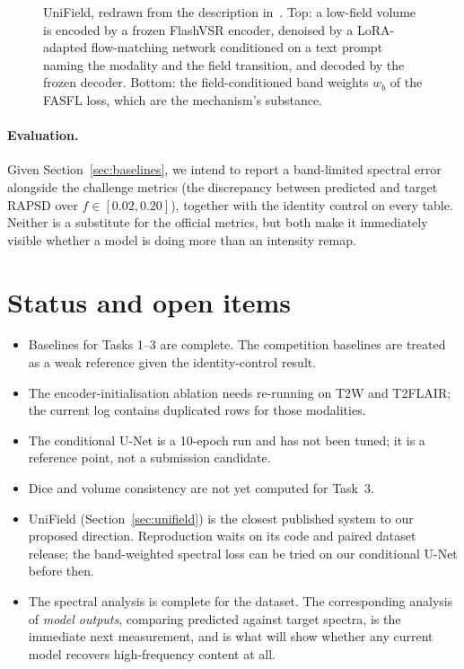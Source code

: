\documentclass[11pt,a4paper]{article}
\begin{document}
\begin{figure}[t]
  \caption{UniField, redrawn from the description in~\cite{lin2026unifield}. Top: a low-field volume is
  encoded by a frozen FlashVSR encoder, denoised by a LoRA-adapted flow-matching network conditioned on
  a text prompt naming the modality and the field transition, and decoded by the frozen decoder. Bottom:
  the field-conditioned band weights $w_b$ of the FASFL loss, which are the mechanism's substance.}
  \label{fig:unifield}
\end{figure}

\paragraph{Evaluation.} Given Section~\ref{sec:baselines}, we intend to report a band-limited spectral
error alongside the challenge metrics (the discrepancy between predicted and target RAPSD over
$f \in [0.02, 0.20]$), together with the identity control on every table. Neither is a substitute for
the official metrics, but both make it immediately visible whether a model is doing more than an
intensity remap.

\section{Status and open items}

\begin{itemize}
  \item Baselines for Tasks 1--3 are complete. The competition baselines are treated as a weak
  reference given the identity-control result.
  \item The encoder-initialisation ablation needs re-running on T2W and T2FLAIR; the current log
  contains duplicated rows for those modalities.
  \item The conditional U-Net is a 10-epoch run and has not been tuned; it is a reference point, not a
  submission candidate.
  \item Dice and volume consistency are not yet computed for Task~3.
  \item UniField (Section~\ref{sec:unifield}) is the closest published system to our proposed direction.
  Reproduction waits on its code and paired dataset release; the band-weighted spectral loss can be
  tried on our conditional U-Net before then.
  \item The spectral analysis is complete for the dataset. The corresponding analysis of \emph{model
  outputs}, comparing predicted against target spectra, is the immediate next measurement, and is
  what will show whether any current model recovers high-frequency content at all.
\end{itemize}
\end{document}
